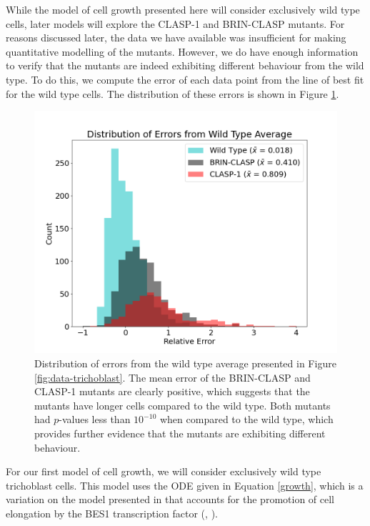 \medskip

While the model of cell growth presented here will consider exclusively wild type cells, later models will explore the CLASP-1 and BRIN-CLASP mutants. For reasons discussed later, the data we have available was insufficient for making quantitative modelling of the mutants. However, we do have enough information to verify that the mutants are indeed exhibiting different behaviour from the wild type. To do this, we compute the error of each data point from the line of best fit for the wild type cells. The distribution of these errors is shown in Figure \ref{fig:trichoblast-distribution}.

\begin{figure}
    \centering
    \label{fig:trichoblast-distribution}
    \includegraphics[width=13cm]{img/trichoblast-distribution.png}
    \caption{Distribution of errors from the wild type average presented in Figure \ref{fig:data-trichoblast}. The mean error of the BRIN-CLASP and CLASP-1 mutants are clearly positive, which suggests that the mutants have longer cells compared to the wild type. Both mutants had $p$-values less than $10^{-10}$ when compared to the wild type, which provides further evidence that the mutants are exhibiting different behaviour. }
\end{figure}


\medskip

For our first model of cell growth, we will consider exclusively wild type trichoblast cells. This model uses the ODE given in Equation \eqref{growth}, which is a variation on the model presented in \cite{lockhart1965} that accounts for the promotion of cell elongation by the BES1 transcription factor (\cite{vukasinovic2021}, \cite{ackerman-lavert2020}).

